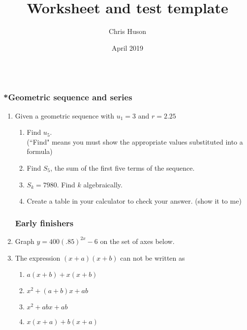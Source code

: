 \documentclass[12pt, oneside]{article}
\title{Worksheet and test template}
\author{Chris Huson}
\date{April 2019}
\begin{document}
\subsubsection*{\\*Geometric sequence and series}

\begin{enumerate}

\item Given a geometric sequence with $u_1=3$ and $r=2.25$
  \begin{enumerate}
      \item Find $u_5$. \\
      (``Find" means you must show the appropriate values substituted into a formula)\\[95pt]
      \item Find $S_5$, the sum of the first five terms of the sequence.\\[145pt]
      \item $S_k=7980$. Find $k$ algebraically.\\[145pt]
      \item Create a table in your calculator to check your answer. (show it to me)
  \end{enumerate}

\newpage
\subsubsection*{Early finishers}

\item Graph $y=400(.85)^{2x}-6$ on the set of axes below.
\begin{center}
\end{center} %

\item The expression $(x + a)(x + b)$ can not be written as
\begin{enumerate}
    \item $a(x + b)+ x(x + b)$
    \item $x^2 + (a + b)x + ab$
    \item  $x^2 + abx + ab$
    \item $x(x + a)+ b(x + a)$
\end{enumerate}

\end{enumerate}
\end{document}
